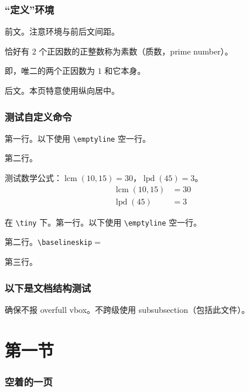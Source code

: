 \documentclass{../pkslide}
\newcommand{\lcm}{\operatorname{lcm}} %
\newcommand{\lpd}{\operatorname{lpd}} %
\begin{document}
\begin{frame}[c]
  \frametitle{“定义”环境}
  
  前文。注意环境与前后文间距。
  
  \begin{definition}[素数]
    恰好有 $2$ 个正因数的正整数称为{素数（质数，prime number）}。
    
    即，唯二的两个正因数为 $1$ 和它本身。
  \end{definition}
  
  后文。本页特意使用纵向居中。
\end{frame}

\begin{frame}[fragile]
  \frametitle{测试自定义命令}
  
  第一行。以下使用 \verb|\emptyline| 空一行。
  
  \emptyline
  
  第二行。
  
  测试数学公式：$\lcm(10, 15) = 30$，$\lpd(45) = 3$。
  \begin{align*}
    \lcm(10, 15) &= 30 \\
    \lpd(45) &= 3
  \end{align*}
  {\tiny
    在 \verb|\tiny| 下。第一行。以下使用 \verb|\emptyline| 空一行。
    
    \emptyline
    
    第二行。\verb|\baselineskip|${}={}$\the\baselineskip
    
    \vspace{0.6\baselineskip}
    
    第三行。
    
  } %
\end{frame}

\begin{frame}[c]
  \frametitle{以下是文档结构测试}
  
  确保不报 overfull vbox。不跨级使用 subsubsection（包括此文件）。
  
  \begin{multicols}{2}
    \tableofcontents
  \end{multicols}
\end{frame}

\section{第一节}

\begin{frame}
  \frametitle{空着的一页}
\end{frame}
\end{document}
